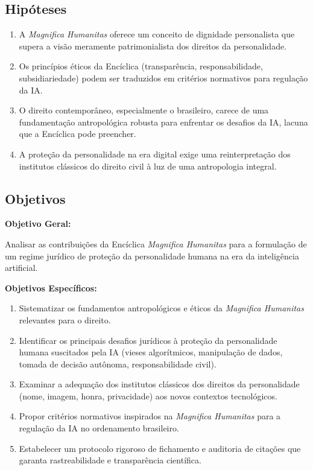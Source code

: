 \documentclass[12pt,a4paper]{article}
\begin{document}
\subsection{Hipóteses}

\begin{enumerate}[label=H\arabic*.]
\item A \textit{Magnifica Humanitas} oferece um conceito de dignidade personalista que supera a visão meramente patrimonialista dos direitos da personalidade.
\item Os princípios éticos da Encíclica (transparência, responsabilidade, subsidiariedade) podem ser traduzidos em critérios normativos para regulação da IA.
\item O direito contemporâneo, especialmente o brasileiro, carece de uma fundamentação antropológica robusta para enfrentar os desafios da IA, lacuna que a Encíclica pode preencher.
\item A proteção da personalidade na era digital exige uma reinterpretação dos institutos clássicos do direito civil à luz de uma antropologia integral.
\end{enumerate}

\subsection{Objetivos}

\textbf{Objetivo Geral:}

Analisar as contribuições da Encíclica \textit{Magnifica Humanitas} para a formulação de um regime jurídico de proteção da personalidade humana na era da inteligência artificial.

\textbf{Objetivos Específicos:}

\begin{enumerate}[label=OE\arabic*.]
\item Sistematizar os fundamentos antropológicos e éticos da \textit{Magnifica Humanitas} relevantes para o direito.
\item Identificar os principais desafios jurídicos à proteção da personalidade humana suscitados pela IA (vieses algorítmicos, manipulação de dados, tomada de decisão autônoma, responsabilidade civil).
\item Examinar a adequação dos institutos clássicos dos direitos da personalidade (nome, imagem, honra, privacidade) aos novos contextos tecnológicos.
\item Propor critérios normativos inspirados na \textit{Magnifica Humanitas} para a regulação da IA no ordenamento brasileiro.
\item Estabelecer um protocolo rigoroso de fichamento e auditoria de citações que garanta rastreabilidade e transparência científica.
\end{enumerate}
\end{document}
